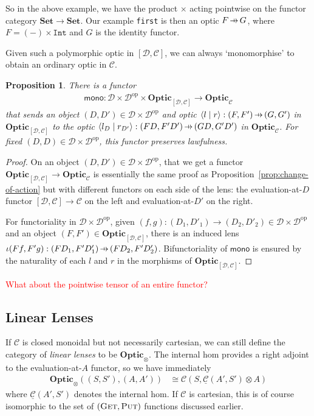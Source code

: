 \documentclass[11pt,letterpaper]{article}
\theoremstyle{plain}
\newtheorem{proposition}[theorem]{Proposition}
\theoremstyle{definition}
\newtheorem{remark}[theorem]{Remark}
\newcommand{\C}{\mathscr{C}}
\newcommand{\homC}{\underline{\C}}
\newcommand{\D}{\mathscr{D}}
\newcommand{\Set}{\mathbf{Set}}
\newcommand{\Optic}{\mathbf{Optic}}
\newcommand{\op}{\mathrm{op}}
\newcommand{\rep}[2]{{\ensuremath \left\langle #1 \mid #2 \right\rangle}}
\newcommand{\fget}{\textsc{Get}}
\newcommand{\fput}{\textsc{Put}}
\newcommand{\hto}{\ensuremath{\,\mathaccent\shortmid\rightarrow\,}}
\newcommand{\todo}[1]{\textcolor{red}{\small #1}}
\begin{document}
So in the above example, we have the product $\times$ acting pointwise on the functor category $\Set \to \Set$. Our example \texttt{first} is then an optic $F \hto G$, where $F = (-) \times \texttt{Int}$ and $G$ is the identity functor.

Given such a polymorphic optic in $[\D, \C]$, we can always `monomorphise' to obtain an ordinary optic in $\C$.
\begin{proposition}
  There is a functor
  \begin{align*}
    \mathsf{mono} : \D \times \D^\op \times \Optic_{[\D, \C]} \to \Optic_\C
  \end{align*}
  that sends an object $(D, D') \in \D \times \D^\op$ and optic $\rep{l}{r} : (F, F') \hto (G, G')$ in $\Optic_{[\D, \C]}$ to the optic $\rep{l_D}{r_{D'}} : (FD, F'D') \hto (GD, G'D')$ in $\Optic_\C$. For fixed $(D, D) \in \D \times \D^\op$, this functor preserves lawfulness.
\end{proposition}
\begin{proof}
  On an object $(D, D') \in \D \times \D^\op$, that we get a functor $\Optic_{[\D, \C]} \to \Optic_\C$ is essentially the same proof as Proposition~\ref{prop:change-of-action} but with different functors on each side of the lens: the evaluation-at-$D$ functor $[\D, \C] \to \C$ on the left and evaluation-at-$D'$ on the right.

  For functoriality in $\D \times \D^\op$, given $(f, g) : (D_1, D'_1) \to (D_2, D'_2) \in \D \times \D^\op$ and an object $(F, F') \in \Optic_{[\D, \C]}$, there is an induced lens $\iota(Ff, F'g) : (FD_1, F'D'_1) \hto (FD_2, F'D'_2)$. Bifunctoriality of $\mathsf{mono}$ is ensured by the naturality of each $l$ and $r$ in the morphisms of $\Optic_{[\D, \C]}$.
\end{proof}


\todo{What about the pointwise tensor of an entire functor?}

\subsection{Linear Lenses}\label{sec:linear-lenses}
\newcommand{\ev}{\mathsf{ev}}
\newcommand{\coev}{\mathsf{coev}}

If $\C$ is closed monoidal but not necessarily cartesian, we can still define the category of \emph{linear lenses} to be $\Optic_\otimes$. The internal hom provides a right adjoint to the evaluation-at-$A$ functor, so we have immediately
\begin{align*}
  \Optic_\otimes((S, S'), (A, A')) &\cong \C(S, \homC(A',S') \otimes A)
\end{align*}
where $\homC(A', S')$ denotes the internal hom. If $\C$ is cartesian, this is of course isomorphic to the set of $(\fget, \fput)$ functions discussed earlier.
\end{document}
